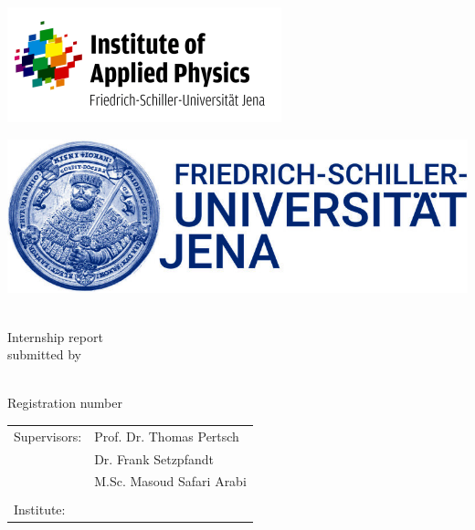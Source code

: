\thispagestyle{empty}
\begin{titlepage}
\vspace{-8cm}
\begin{minipage}{0.5\textwidth}
	\centering
	\hspace{-2cm}
	\includegraphics[scale=0.6]{Images/Logo IAP.png}
	\end{minipage}
	\hfill
	\begin{minipage}{0.5\textwidth}
	\hspace{1.25cm}
	\includegraphics[scale=0.2]{Images/FSU_Logo.jpg}
\end{minipage}

\vspace{0.5cm}
\begin{center}
	
	\huge
	\textbf{\titel}\\[1cm]
	\Large
	Internship report\\[1cm]
	\large
	submitted by
	
	\Large
	\autor\\[0.5cm]
	\small
	Registration number \matrikelnr\\[2cm]
	
	
	\large
	\begin{tabular}{p{3cm}p{8cm}}\\
		Supervisors: & \quad Prof. Dr. Thomas Pertsch\\
					& \quad Dr. Frank Setzpfandt\\
					& \quad M.Sc. Masoud Safari Arabi\\
					& \quad \\				
		Institute: & \quad \unternehmen
	\end{tabular}
\end{center}


\end{titlepage}
